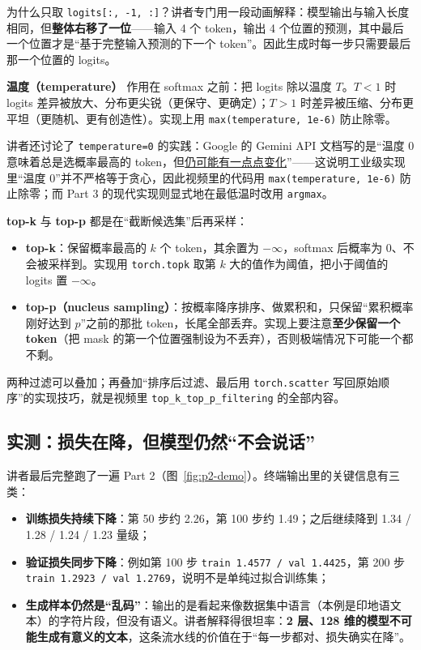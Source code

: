 为什么只取 \texttt{logits[:, -1, :]}？讲者专门用一段动画解释：模型输出与输入长度相同，但\textbf{整体右移了一位}——输入 4 个 token，输出 4 个位置的预测，其中最后一个位置才是“基于完整输入预测的下一个 token”。因此生成时每一步只需要最后那一个位置的 logits。

\textbf{温度（temperature）} 作用在 softmax 之前：把 logits 除以温度 $T$。$T<1$ 时 logits 差异被放大、分布更尖锐（更保守、更确定）；$T>1$ 时差异被压缩、分布更平坦（更随机、更有创造性）。实现上用 \texttt{max(temperature, 1e-6)} 防止除零。

讲者还讨论了 \texttt{temperature=0} 的实践：Google 的 Gemini API 文档写的是“温度 0 意味着总是选概率最高的 token，但\underline{仍可能有一点点变化}”——这说明工业级实现里“温度 0”并不严格等于贪心，因此视频里的代码用 \texttt{max(temperature, 1e-6)} 防止除零；而 Part 3 的现代实现则显式地在最低温时改用 \texttt{argmax}。

\textbf{top-k} 与 \textbf{top-p} 都是在“截断候选集”后再采样：

\begin{itemize}
\item \textbf{top-k}：保留概率最高的 $k$ 个 token，其余置为 $-\infty$，softmax 后概率为 0、不会被采样到。实现用 \texttt{torch.topk} 取第 $k$ 大的值作为阈值，把小于阈值的 logits 置 $-\infty$。
\item \textbf{top-p（nucleus sampling）}：按概率降序排序、做累积和，只保留“累积概率刚好达到 $p$”之前的那批 token，长尾全部丢弃。实现上要注意\textbf{至少保留一个 token}（把 mask 的第一个位置强制设为不丢弃），否则极端情况下可能一个都不剩。
\end{itemize}

两种过滤可以叠加；再叠加“排序后过滤、最后用 \texttt{torch.scatter} 写回原始顺序”的实现技巧，就是视频里 \texttt{top\_k\_top\_p\_filtering} 的全部内容。

\subsection{实测：损失在降，但模型仍然“不会说话”}

讲者最后完整跑了一遍 Part 2（图~\ref{fig:p2-demo}）。终端输出里的关键信息有三类：

\begin{itemize}
\item \textbf{训练损失持续下降}：第 50 步约 2.26，第 100 步约 1.49；之后继续降到 1.34 / 1.28 / 1.24 / 1.23 量级；
\item \textbf{验证损失同步下降}：例如第 100 步 \texttt{train 1.4577 / val 1.4425}，第 200 步 \texttt{train 1.2923 / val 1.2769}，说明不是单纯过拟合训练集；
\item \textbf{生成样本仍然是“乱码”}：输出的是看起来像数据集中语言（本例是印地语文本）的字符片段，但没有语义。讲者解释得很坦率：\textbf{2 层、128 维的模型不可能生成有意义的文本}，这条流水线的价值在于“每一步都对、损失确实在降”。
\end{itemize}

